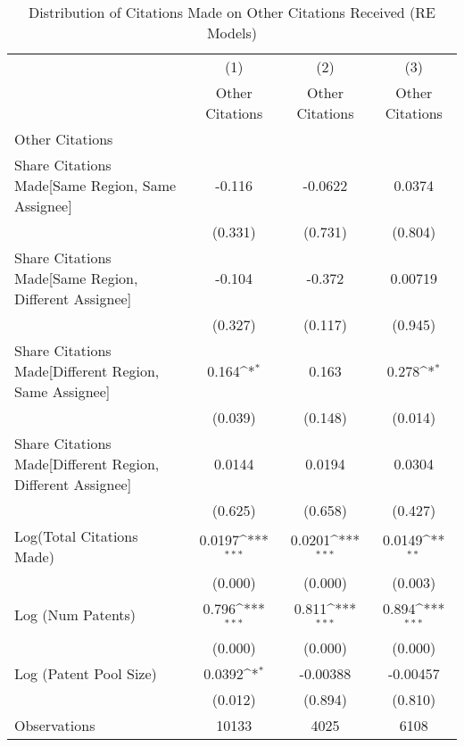 {
\def\sym#1{\ifmmode^{#1}\else\(^{#1}\)\fi}
\begin{longtable}{l*{3}{c}}
\caption{Distribution of Citations Made on Other Citations Received (RE Models) \label{model282930}}\\
\hline\hline\endfirsthead\hline\endhead\hline\endfoot\endlastfoot
                &\multicolumn{1}{c}{(1)}&\multicolumn{1}{c}{(2)}&\multicolumn{1}{c}{(3)}\\
                &\multicolumn{1}{c}{Other Citations}&\multicolumn{1}{c}{Other Citations}&\multicolumn{1}{c}{Other Citations}\\
\hline
Other Citations &                  &                  &                  \\
Share Citations Made[Same Region, Same Assignee]&   -0.116         &  -0.0622         &   0.0374         \\
                &  (0.331)         &  (0.731)         &  (0.804)         \\
Share Citations Made[Same Region, Different Assignee]&   -0.104         &   -0.372         &  0.00719         \\
                &  (0.327)         &  (0.117)         &  (0.945)         \\
Share Citations Made[Different Region, Same Assignee]&    0.164\sym{*}  &    0.163         &    0.278\sym{*}  \\
                &  (0.039)         &  (0.148)         &  (0.014)         \\
Share Citations Made[Different Region, Different Assignee]&   0.0144         &   0.0194         &   0.0304         \\
                &  (0.625)         &  (0.658)         &  (0.427)         \\
Log(Total Citations Made)&   0.0197\sym{***}&   0.0201\sym{***}&   0.0149\sym{**} \\
                &  (0.000)         &  (0.000)         &  (0.003)         \\
Log (Num Patents)&    0.796\sym{***}&    0.811\sym{***}&    0.894\sym{***}\\
                &  (0.000)         &  (0.000)         &  (0.000)         \\
Log (Patent Pool Size)&   0.0392\sym{*}  & -0.00388         & -0.00457         \\
                &  (0.012)         &  (0.894)         &  (0.810)         \\
\hline
Observations    &    10133         &     4025         &     6108         \\

\end{longtable}}
